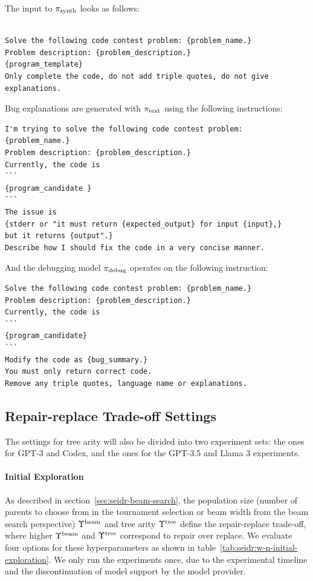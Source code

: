 The input to $ \pi_\text{synth} $ looks as follows: 
\begin{lstlisting}

Solve the following code contest problem: {problem_name.}
Problem description: {problem_description.}
{program_template}
Only complete the code, do not add triple quotes, do not give explanations.
\end{lstlisting}

Bug explanations are generated with $ \pi_\text{text} $ using the following instructions:
\begin{lstlisting}
I'm trying to solve the following code contest problem: {problem_name.}
Problem description: {problem_description.}
Currently, the code is
```
{program_candidate }
```
The issue is 
{stderr or "it must return {expected_output} for input {input},} 
but it returns {output".}
Describe how I should fix the code in a very concise manner. 
\end{lstlisting}

And the debugging model $ \pi_\text{debug} $ operates on the following instruction:
\begin{lstlisting}
Solve the following code contest problem: {problem_name.} 
Problem description: {problem_description.} 
Currently, the code is  
```
{program_candidate} 
```
Modify the code as {bug_summary.} 
You must only return correct code.  
Remove any triple quotes, language name or explanations.
\end{lstlisting}



\newpage\subsection{Repair-replace Trade-off Settings}
\label{sec:seidr-trade-off-settings}

The settings for tree arity will also be divided into two experiment sets: the ones for GPT-3 and Codex, and the ones for the GPT-3.5 and Llama 3 experiments.

\paragraph{Initial Exploration}
\label{sec:seidr-tree arity-gpt-3}
As described in section~\ref{sec:seidr-beam-search}, the population size (number of parents to choose from in the tournament selection or beam width from the beam search perspective) $\Upsilon^\text{beam}{}$ and tree arity $\Upsilon^\text{tree}{}$ define the repair-replace trade-off, where higher $\Upsilon^\text{beam}{}$ and $\Upsilon^\text{tree}{}$ correspond to repair over replace. 
We evaluate four options for these hyperparameters as shown in table~\ref{tab:seidr:w-n-initial-exploration}. 
We only run the experiments once, due to the experimental timeline and the discontinuation of model support by the model provider. 


